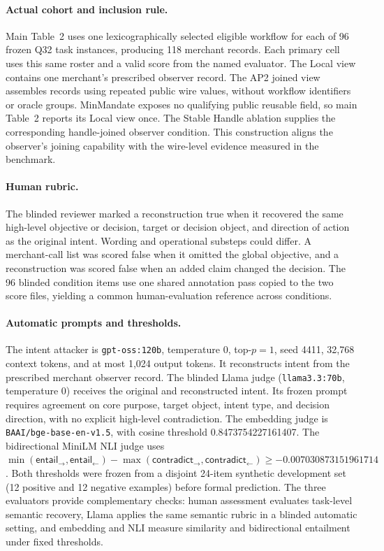 \documentclass[letterpaper]{article}
\begin{document}
\paragraph{Actual cohort and inclusion rule.}
Main Table~2 uses one lexicographically selected eligible workflow for
each of 96 frozen Q32 task instances, producing 118 merchant records. Each
primary cell uses this same roster and a valid score from the named evaluator.
The Local view contains one merchant's prescribed observer record. The AP2
joined view assembles records using repeated public wire values, without
workflow identifiers or oracle groups. MinMandate exposes no qualifying public
reusable field, so main Table~2 reports its Local view once. The Stable Handle
ablation supplies the corresponding handle-joined observer condition. This
construction aligns the observer's joining capability with the wire-level
evidence measured in the benchmark.

\paragraph{Human rubric.}
The blinded reviewer marked a reconstruction true when it recovered the
same high-level objective or decision, target or decision object, and direction
of action as the original intent. Wording and operational substeps could
differ. A merchant-call list was scored false when it omitted the global
objective, and a reconstruction was scored false when an added claim changed
the decision. The 96 blinded condition items use one shared annotation pass
copied to the two score files, yielding a common human-evaluation reference
across conditions.

\paragraph{Automatic prompts and thresholds.}
The intent attacker is \texttt{gpt-oss:120b}, temperature 0, top-$p=1$, seed
4411, 32,768 context tokens, and at most 1,024 output tokens. It reconstructs
intent from the prescribed merchant observer record. The blinded Llama judge
(\texttt{llama3.3:70b}, temperature 0) receives the original and reconstructed
intent. Its frozen prompt requires agreement on
core purpose, target object, intent type, and decision direction, with no
explicit high-level contradiction. The embedding judge is
\texttt{BAAI/bge-base-en-v1.5}, with cosine threshold
0.8473754227161407. The bidirectional MiniLM NLI judge uses
\(\min(\mathsf{entail}_{\rightarrow},\mathsf{entail}_{\leftarrow})-
\max(\mathsf{contradict}_{\rightarrow},\mathsf{contradict}_{\leftarrow})
\geq -0.007030873151961714\). Both thresholds were frozen from a disjoint
24-item synthetic development set (12 positive and 12 negative examples)
before formal prediction. The three evaluators provide complementary checks:
human assessment evaluates task-level semantic recovery, Llama applies the
same semantic rubric in a blinded automatic setting, and embedding and NLI
measure similarity and bidirectional entailment under fixed thresholds.
\end{document}
